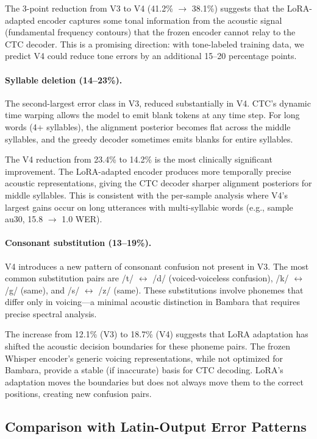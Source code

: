 \documentclass[11pt]{article}
\begin{document}
The 3-point reduction from V3 to V4 (41.2\% $\to$ 38.1\%) suggests that the LoRA-adapted encoder captures some tonal information from the acoustic signal (fundamental frequency contours) that the frozen encoder cannot relay to the CTC decoder.
This is a promising direction: with tone-labeled training data, we predict V4 could reduce tone errors by an additional 15--20 percentage points.

\paragraph{Syllable deletion (14--23\%).}
The second-largest error class in V3, reduced substantially in V4.
CTC's dynamic time warping allows the model to emit blank tokens at any time step.
For long words (4+ syllables), the alignment posterior becomes flat across the middle syllables, and the greedy decoder sometimes emits blanks for entire syllables.

The V4 reduction from 23.4\% to 14.2\% is the most clinically significant improvement.
The LoRA-adapted encoder produces more temporally precise acoustic representations, giving the CTC decoder sharper alignment posteriors for middle syllables.
This is consistent with the per-sample analysis where V4's largest gains occur on long utterances with multi-syllabic words (e.g., sample au30, 15.8 $\to$ 1.0 WER).

\paragraph{Consonant substitution (13--19\%).}
V4 introduces a new pattern of consonant confusion not present in V3.
The most common substitution pairs are /t/ $\leftrightarrow$ /d/ (voiced-voiceless confusion), /k/ $\leftrightarrow$ /g/ (same), and /s/ $\leftrightarrow$ /z/ (same).
These substitutions involve phonemes that differ only in voicing---a minimal acoustic distinction in Bambara that requires precise spectral analysis.

The increase from 12.1\% (V3) to 18.7\% (V4) suggests that LoRA adaptation has shifted the acoustic decision boundaries for these phoneme pairs.
The frozen Whisper encoder's generic voicing representations, while not optimized for Bambara, provide a stable (if inaccurate) basis for CTC decoding.
LoRA's adaptation moves the boundaries but does not always move them to the correct positions, creating new confusion pairs.

\subsection{Comparison with Latin-Output Error Patterns}
\end{document}
